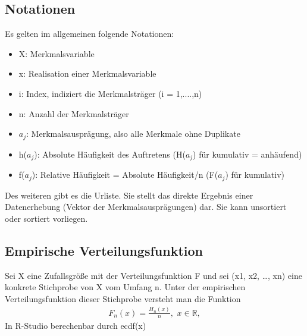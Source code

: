 \documentclass[a4paper,10pt]{scrartcl}
\begin{document}
\subsection{Notationen}
Es gelten im allgemeinen folgende Notationen:
\begin{itemize}
    \item X: Merkmalsvariable
    \item x: Realisation einer Merkmalsvariable
    \item i: Index, indiziert die Merkmalsträger (i = 1,....,n)
    \item n: Anzahl der Merkmalsträger
    \item \(a_j\): Merkmalsausprägung, also alle Merkmale ohne Duplikate
    \item h(\(a_j\)): Absolute Häufigkeit des Auftretens (H(\(a_j\)) für kumulativ = anhäufend)
    \item f(\(a_j\)): Relative Häufigkeit = Absolute Häufigkeit/n (F(\(a_j\)) für kumulativ)
\end{itemize}
Des weiteren gibt es die Urliste. Sie stellt das direkte Ergebnis einer Datenerhebung (Vektor der Merkmalsausprägungen) dar. Sie kann unsortiert oder sortiert vorliegen.
\subsection{Empirische Verteilungsfunktion}
Sei X eine Zufallsgröße mit der Verteilungsfunktion F und sei (x1, x2, …, xn) eine konkrete Stichprobe von X vom Umfang n. Unter der empirischen Verteilungsfunktion dieser Stichprobe versteht man die Funktion
\begin{eqnarray*}{F}_{n}(x)=\frac{{H}_{n}(x)}{n},\,\,x\in {\mathbb{R}},\end{eqnarray*}
In R-Studio berechenbar durch ecdf(x)
\end{document}
